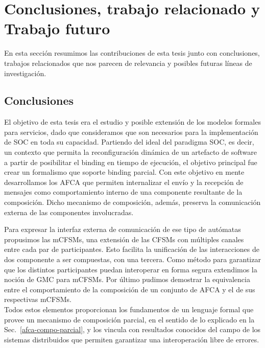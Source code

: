 \newpage
\chapter{Conclusiones, trabajo relacionado y Trabajo futuro} 
\label{conclusiones}

En esta sección resumimos las contribuciones de esta tesis junto con conclusiones, trabajos relacionados que nos parecen de relevancia y posibles futuras líneas de investigación.


\section{Conclusiones} 

El objetivo de esta tesis era el estudio y posible extensión de los modelos formales para servicios, dado que consideramos que son necesarios para la implementación de SOC en toda su capacidad. Partiendo del ideal del paradigma SOC, es decir, un contexto que permita la reconfiguración dinámica de un artefacto de software a partir de posibilitar el binding en tiempo de ejecución, el objetivo principal fue crear un formalismo que soporte binding parcial. Con este objetivo en mente desarrollamos los AFCA que permiten internalizar el envío y la recepción de mensajes como comportamiento interno de una componente resultante de la composición. Dicho mecanismo de composición, además, preserva la comunicación externa de las componentes involucradas.

Para expresar la interfaz externa de comunicación de ese tipo de autómatas propusimos las mCFSMs, una extensión de las CFSMs con múltiples canales entre cada par de participantes. Esto facilita la unificación de las interacciones de dos componente a ser compuestas, con una tercera. Como método para garantizar que los distintos participantes puedan interoperar en forma segura extendimos la noción de GMC para mCFSMs. Por último pudimos demostrar la equivalencia entre el comportamiento de la composición de un conjunto de AFCA y el de sus respectivas mCFSMs.\\
Todos estos elementos proporcionan los fundamentos de un lenguaje formal que provee un mecanismo de composición parcial, en el sentido de lo explicado en la Sec.~\ref{afca-compo-parcial}, y los vincula con resultados conocidos del campo de los sistemas distribuidos que permiten garantizar una interoperación libre de errores.

